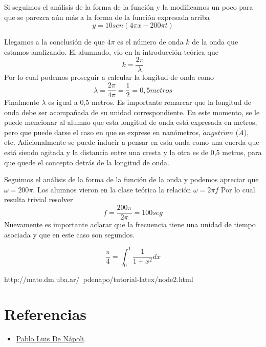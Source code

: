 \documentclass[spanish] {article}
\begin{document}
Si seguimos el análisis de la forma de la función y la modificamos un poco para que se parezca aún más a la forma de la función expresada arriba
$$y = 10 sen  (4 \pi x- 200 \pi t)$$

Llegamos a la conclusión de que $4 \pi$ es el número de onda $k$ de la onda que estamos analizando. El alumnado, vio en la introducción teórica que 
$$ k = \frac{2\pi}{\lambda}$$
Por lo cual podemos proseguir a calcular la longitud de onda como
$$ \lambda = \frac{2\pi}{4\pi} = \frac{1}{2} = 0,5 metros$$ 
Finalmente $\lambda$ es igual a 0,5 metros. Es importante remarcar que la longitud de onda debe ser acompañada de su unidad correspondiente. En este momento, se le puede mencionar al alumno que esta longitud de onda está expresada en metros, pero que puede darse el caso en que se exprese en nanómetros, $\mathring{a}ngstr\ddot{o}m$ ($\mathring{A}$), etc.
Adicionalmente se puede inducir a pensar en esta onda como una cuerda que está siendo agitada y la distancia entre una cresta y la otra es de 0,5 metros, para que quede el concepto detrás de la longitud de onda.

Seguimos el análisis de la forma de la función de la onda y podemos apreciar que $ \omega = 200 \pi $. Los alumnos vieron en la clase teórica la relación $ \omega = 2 \pi f $
Por lo cual resulta trivial resolver
$$ f = \frac{200 \pi}{2 \pi} = 100 seg$$
Nuevamente es importante aclarar que la frecuencia tiene una unidad de tiempo asociada y que en este caso son segundos.


$$ \frac{\pi}{4} = \int_0^1 \frac{1}{1+x^2} dx $$


http://mate.dm.uba.ar/~pdenapo/tutorial-latex/node2.html
\newpage
\section{Referencias}

\begin{itemize}
  \item \href{http://mate.dm.uba.ar/~pdenapo/tutorial-latex/node2.html}{Pablo Luis De Nápoli}.
\end{itemize}
\end{document}
